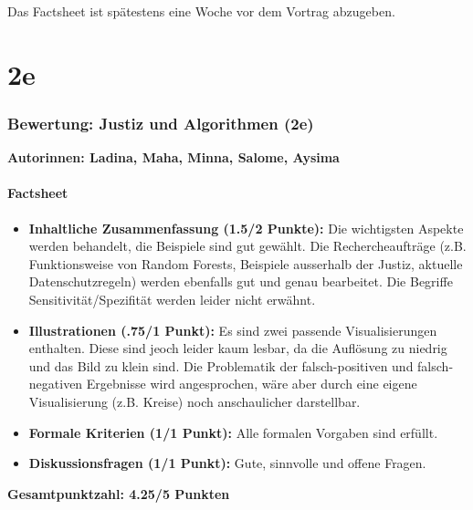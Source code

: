 Das Factsheet ist spätestens eine Woche vor dem Vortrag abzugeben.


\newpage
\part*{2e}
\newpage


\section*{Bewertung: Justiz und Algorithmen (2e)}

\textbf{Autorinnen: Ladina, Maha, Minna, Salome, Aysima}

\subsection*{Factsheet}

\begin{itemize}
    \item \textbf{Inhaltliche Zusammenfassung (1.5/2 Punkte):} Die wichtigsten Aspekte werden behandelt, die Beispiele sind gut gewählt. Die Rechercheaufträge (z.B. Funktionsweise von Random Forests, Beispiele ausserhalb der Justiz, aktuelle Datenschutzregeln) werden ebenfalls gut und genau bearbeitet. Die Begriffe Sensitivität/Spezifität werden leider nicht erwähnt.
    \item \textbf{Illustrationen (.75/1 Punkt):} Es sind zwei passende Visualisierungen enthalten. Diese sind jeoch leider kaum lesbar, da die Auflösung zu niedrig und das Bild zu klein sind. Die Problematik der falsch-positiven und falsch-negativen Ergebnisse wird angesprochen, wäre aber durch eine eigene Visualisierung (z.B. Kreise) noch anschaulicher darstellbar.
    \item \textbf{Formale Kriterien (1/1 Punkt):} Alle formalen Vorgaben sind erfüllt.
    \item \textbf{Diskussionsfragen (1/1 Punkt):} Gute, sinnvolle und offene Fragen.
\end{itemize}

\textbf{Gesamtpunktzahl: 4.25/5 Punkten}

